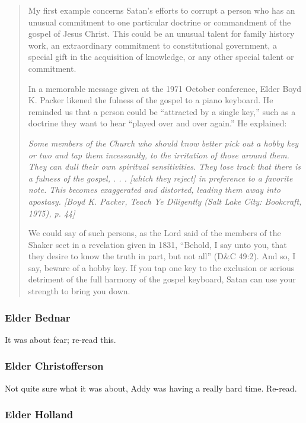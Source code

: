 \begin{quote}
My first example concerns Satan's efforts to corrupt a person who has an unusual commitment to one particular doctrine or commandment of the gospel of Jesus Christ. This could be an unusual talent for family history work, an extraordinary commitment to constitutional government, a special gift in the acquisition of knowledge, or any other special talent or commitment.

In a memorable message given at the 1971 October conference, Elder Boyd K. Packer likened the fulness of the gospel to a piano keyboard. He reminded us that a person could be ``attracted by a single key,'' such as a doctrine they want to hear ``played over and over again.'' He explained:

\textit{Some members of the Church who should know better pick out a hobby key or two and tap them incessantly, to the irritation of those around them. They can dull their own spiritual sensitivities. They lose track that there is a fulness of the gospel, . . . [which they reject] in preference to a favorite note. This becomes exaggerated and distorted, leading them away into apostasy. [Boyd K. Packer, \textit{Teach Ye Diligently} (Salt Lake City: Bookcraft, 1975), p. 44]}

We could say of such persons, as the Lord said of the members of the Shaker sect in a revelation given in 1831, ``Behold, I say unto you, that they desire to know the truth in part, but not all'' (D\&C 49:2). And so, I say, beware of a hobby key. If you tap one key to the exclusion or serious detriment of the full harmony of the gospel keyboard, Satan can use your strength to bring you down.
\end{quote}

\subsubsection{Elder Bednar}

It was about fear; re-read this.

\subsubsection{Elder Christofferson}

Not quite sure what it was about, Addy was having a really hard time. Re-read.

\subsubsection{Elder Holland}

